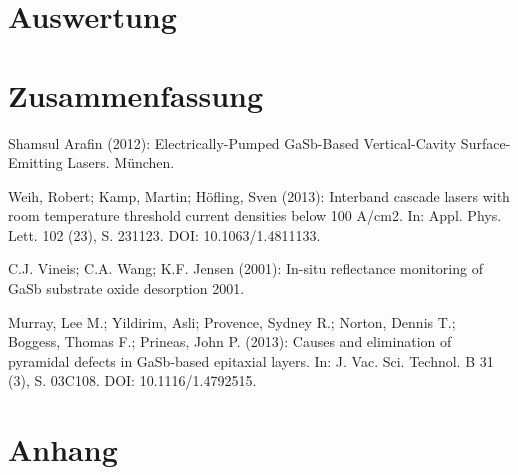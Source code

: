 \documentclass[paper=a4,fontsize=10pt,DIV=18,twocolumn,parskip=half]{scrartcl}
\numberwithin{equation}{section}    %
\begin{document}
\section{Auswertung}
%






%
\section{Zusammenfassung}
%

%
\begin{thebibliography}{}   
%

 Shamsul Arafin (2012): Electrically-Pumped GaSb-Based Vertical-Cavity Surface-Emitting Lasers. München.

 Weih, Robert; Kamp, Martin; Höfling, Sven (2013): Interband cascade lasers with room temperature threshold current densities below 100 A/cm2. In: Appl. Phys. Lett. 102 (23), S. 231123. DOI: 10.1063/1.4811133.


 C.J. Vineis; C.A. Wang; K.F. Jensen (2001): In-situ reflectance monitoring of GaSb substrate oxide desorption 2001.

 Murray, Lee M.; Yildirim, Asli; Provence, Sydney R.; Norton, Dennis T.; Boggess, Thomas F.; Prineas, John P. (2013): Causes and elimination of pyramidal defects in GaSb-based epitaxial layers. In: J. Vac. Sci. Technol. B 31 (3), S. 03C108. DOI: 10.1116/1.4792515.
  

\end{thebibliography}
%
%
\onecolumn
\pagestyle{empty}
\section{Anhang}
\label{Anhang}
\end{document}
